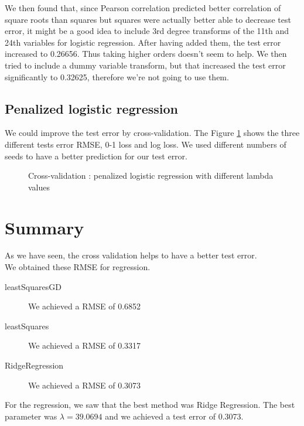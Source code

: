 \documentclass{article} %
\begin{document}
We then found that, since Pearson correlation predicted better correlation of square roots than squares but squares were actually better able to decrease test error, it might be a good idea to include 3rd degree transforms of the 11th and 24th variables for logistic regression. After having added them, the test error increased to 0.26656. Thus taking higher orders doesn’t seem to help. We then tried to include a dummy variable transform, but that increased the test error significantly to 0.32625, therefore we’re not going to use them.
\subsection{Penalized logistic regression}
We could improve the test error by cross-validation. The Figure \ref{fig:crossval} shows the three different tests error RMSE, 0-1 loss and log loss. We used different numbers of seeds to have a better prediction for our test error.
\begin{figure}
\centering
{}
\caption{Cross-validation : penalized logistic regression with different lambda values}
\label{fig:crossval}
\end{figure} 
\section{Summary}
As we have seen, the cross validation helps to have a better test error.\\
We obtained these RMSE for regression.
\begin{description}
\item[leastSquaresGD] We achieved a RMSE of 0.6852
\item[leastSquares] We achieved a RMSE of 0.3317
\item[RidgeRegression] We achieved a RMSE of 0.3073
\end{description}
For the regression, we saw that the best method was Ridge Regression. The best parameter was $\lambda =  39.0694$ and we achieved a test error of 0.3073.
\end{document}
